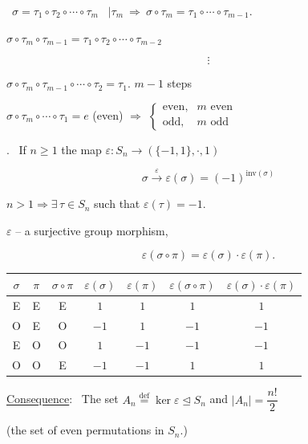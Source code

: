 \documentclass[12pt]{article}
\begin{document}
\noindent{} \ $\sigma=\tau_1\circ\tau_2\circ\cdots\circ\tau_m$ \ $\big|\tau_m \ \Rightarrow \ \sigma\circ\tau_m = \tau_1\circ\cdots\circ\tau_{m-1}.$

\bigskip
\noindent $\sigma\circ\tau_m\circ\tau_{m-1} = \tau_1\circ\tau_2\circ\cdots\circ\tau_{m-2}$

\[
\vdots
\]

\noindent $\sigma\circ\tau_m\circ\tau_{m-1}\circ\cdots\circ\tau_2 = \tau_1$. \quad $m-1$ steps

\bigskip
\noindent $\sigma\circ\tau_m\circ\cdots\circ\tau_1 = e$ (even) \quad $\Rightarrow$ \quad
$\begin{cases} \text{even}, & m \text{ even}\\ \text{odd}, & m \text{ odd} \end{cases}$

\bigskip
\noindent{}. \ If $n\geq 1$ the map $\varepsilon: S_n \to (\{-1,1\},\cdot,1)$

\[
\sigma \xrightarrow{\ \varepsilon\ } \varepsilon(\sigma) = (-1)^{\text{inv}(\sigma)}
\]

\noindent $n>1 \Rightarrow \exists\,\tau\in S_n$ such that $\varepsilon(\tau)=-1$.

\bigskip
\noindent $\varepsilon$ -- a surjective group morphism,

\[
\varepsilon(\sigma\circ\pi) = \varepsilon(\sigma)\cdot\varepsilon(\pi).
\]

\bigskip
\begin{center}
\begin{tabular}{|c|c|c|c|c|c|c|}
\hline
$\sigma$ & $\pi$ & $\sigma\circ\pi$ & $\varepsilon(\sigma)$ & $\varepsilon(\pi)$ & $\varepsilon(\sigma\circ\pi)$ & $\varepsilon(\sigma)\cdot\varepsilon(\pi)$ \\
\hline
E & E & E & $1$ & $1$ & $1$ & $1$ \\
\hline
O & E & O & $-1$ & $1$ & $-1$ & $-1$ \\
\hline
E & O & O & $1$ & $-1$ & $-1$ & $-1$ \\
\hline
O & O & E & $-1$ & $-1$ & $1$ & $1$ \\
\hline
\end{tabular}
\end{center}

\bigskip
\noindent\underline{Consequence}: \ The set $A_n \overset{\text{def}}{=} \ker\varepsilon \trianglelefteq S_n$ and $|A_n| = \dfrac{n!}{2}$

\noindent (the set of even permutations in $S_n$.)
\end{document}
